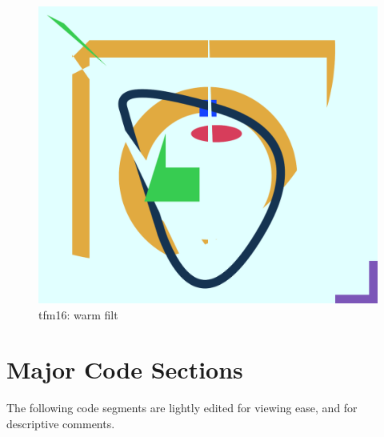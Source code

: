 \documentclass[12pt]{article}
\begin{document}
\begin{figure}[h]
\begin{minipage}[b]{0.3\textwidth}
	\end{minipage}
	\hfill
	\begin{minipage}[b]{0.3\textwidth}
		\includegraphics[width=\textwidth]{./pdf/main-test-out-16.pdf}
		\caption{tfm16: warm filt}
	\end{minipage}
\end{figure}
\vfill
\vspace{20px}

\pagebreak
\section{Major Code Sections}

The following code segments are lightly edited for viewing
ease, and for descriptive comments.\\
\end{document}
